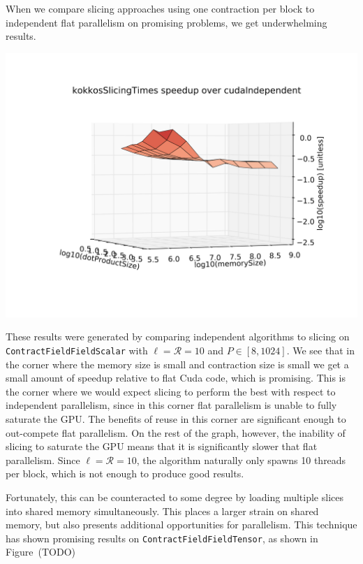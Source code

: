 When we compare slicing approaches using one contraction per block to
independent flat parallelism on promising problems, we get underwhelming
results. 

    \includegraphics[scale = .17]{slicingvsindependent}

These results were generated by comparing independent algorithms to slicing on
\texttt{ContractFieldFieldScalar} with $\ell = \mathcal{R} = 10$ and $P \in [8,1024]$. We see
that in the corner where the memory size is small and contraction size is small
we get a small amount of speedup relative to flat Cuda code, which is
promising. This is the corner where we would expect slicing to perform the best
with respect to independent parallelism, since in this corner flat parallelism
is unable to fully saturate the GPU. The benefits of reuse in this corner are
significant enough to out-compete flat parallelism. On the rest of the graph,
however, the inability of slicing to saturate the GPU means that it is
significantly slower that flat parallelism. Since $\ell = \mathcal{R} = 10$,
the algorithm naturally only spawns 10 threads per block, which is not enough
to produce good results. 

Fortunately, this can be counteracted to some degree by loading multiple slices 
into shared memory simultaneously. This places a larger strain on shared memory, 
but also presents additional opportunities for parallelism. 
This technique has shown promising results on \texttt{ContractFieldFieldTensor}, as shown in Figure~(TODO) %


